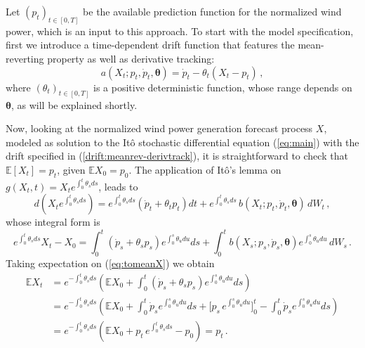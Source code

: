\documentclass[11pt]{article}
\theoremstyle{definition}
\begin{document}
Let $(p_t)_{t \in [0,T]}$ be the available prediction function for the normalized wind power, which is an input to this approach. To start with the model specification, first we introduce a time-dependent drift function that features the mean-reverting property as well as derivative tracking:
\begin{equation}
a(X_t; p_t, \dot{p}_t, \bm{\theta}) = \dot{p}_t  - \theta_t (X_t - p_t)\,,  \label{drift:meanrev-derivtrack}
\end{equation} 
where $ (\theta_t)_{t \in [0,T]} $ is a positive deterministic function, whose range depends on $\bm{\theta}$, as will be explained shortly.

Now, looking at the normalized wind power generation forecast process $X$, modeled as solution to the It\^{o} stochastic differential equation (\ref{eq:main}) with the drift specified in (\ref{drift:meanrev-derivtrack}), it is straightforward to check that $\mathbb{E} \left[X_t\right] = p_t$, given $  \mathbb{E} X_0 = p_0$. The application of  It\^{o}'s lemma on $g(X_t, t) = X_t e^{\int_{0}^{t} \theta_s ds}$, leads to 
\begin{equation*}
d \left( X_t e^{\int_{0}^{t} \theta_s ds} \right) = e^{\int_{0}^{t} \theta_s ds} (\dot{p}_t + \theta_t p_t ) dt  + e^{\int_{0}^{t} \theta_s ds}\, b (X_t; p_t, \dot{p}_t, \bm{\theta} ) \,dW_t\,,
\end{equation*}
whose integral form is
\begin{equation}
e^{\int_{0}^{t} \theta_s ds}  X_t - X_0 = \int_{0}^{t}  (\dot{p}_s + \theta_s p_s ) e^{\int_{0}^{s} \theta_u du} ds + \int_{0}^{t}  b (X_s; p_s, \dot{p}_s, \bm{\theta} )  e^{\int_{0}^{s} \theta_u du}\, d W_s\,.   \label{eq:tomeanX}
\end{equation} 
Taking expectation on (\ref{eq:tomeanX}) we obtain
\begin{align}
\mathbb{E} X_t & = e^{ - \int_{0}^{t} \theta_s ds} \left(  \mathbb{E} X_0 +   \int_{0}^{t}  (\dot{p}_s + \theta_s p_s ) e^{\int_{0}^{s} \theta_u du} ds   \right) \nonumber \\ 
& =  e^{ - \int_{0}^{t} \theta_s ds} \left(  \mathbb{E} X_0 +   \int_{0}^{t}  \dot{p}_s e^{\int_{0}^{s} \theta_u du} ds +  \big[ p_s \, e^{\int_{0}^{s} \theta_u du} \big]^{t}_0  - \int_{0}^{t}  \dot{p}_s e^{\int_{0}^{s} \theta_u du} ds  \right) \nonumber \\
& =  e^{ - \int_{0}^{t} \theta_s ds} \left(  \mathbb{E} X_0 + p_t \, e^{ \int_{0}^{t} \theta_s ds} - p_0 \right) = p_t \,.
\end{align}
\end{document}
